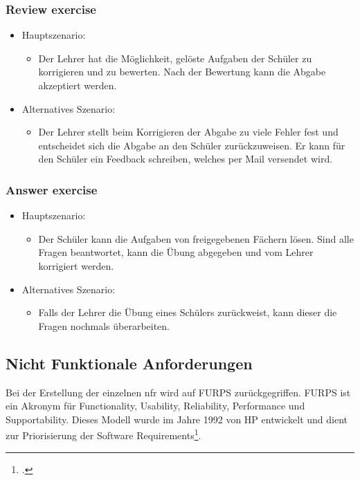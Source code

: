 \subsubsection*{Review exercise}
\begin{itemize}
	\item Hauptszenario:
	\begin{itemize}
		\item Der Lehrer hat die Möglichkeit, gelöste Aufgaben der Schüler zu korrigieren und zu bewerten. Nach der Bewertung kann die Abgabe akzeptiert werden.
	\end{itemize}
	\item Alternatives Szenario:
	\begin{itemize}
		\item Der Lehrer stellt beim Korrigieren der Abgabe zu viele Fehler fest und entscheidet sich die Abgabe an den Schüler zurückzuweisen. Er kann für den Schüler ein Feedback schreiben, welches per Mail versendet wird.
	\end{itemize}
\end{itemize}


\subsubsection*{Answer exercise}
\begin{itemize}
	\item Hauptszenario:
	\begin{itemize}
		\item Der Schüler kann die Aufgaben von freigegebenen Fächern lösen. Sind alle Fragen beantwortet, kann die Übung abgegeben und vom Lehrer korrigiert werden.
	\end{itemize}
	\item Alternatives Szenario:
	\begin{itemize}
		\item Falls der Lehrer die Übung eines Schülers zurückweist, kann dieser die Fragen nochmals überarbeiten.
	\end{itemize}
\end{itemize}

\newpage

\subsection{Nicht Funktionale Anforderungen}
\label{chapter_nfr}
Bei der Erstellung der einzelnen \gls{nfr} wird auf FURPS zurückgegriffen. FURPS ist ein Akronym für Functionality, Usability, Reliability, Performance und Supportability. Dieses Modell wurde im Jahre 1992 von HP entwickelt und dient zur Priorisierung der Software Requirements\footcite{furps_description}. \\

